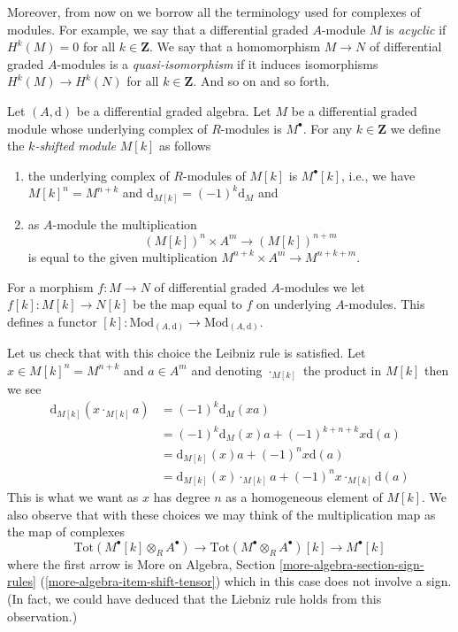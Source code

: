 \medskip\noindent
Moreover, from now on we borrow all the terminology used for
complexes of modules. For example, we say that a differential
graded $A$-module $M$ is {\it acyclic} if $H^k(M) = 0$ for
all $k \in \mathbf{Z}$. We say that a homomorphism $M \to N$
of differential graded $A$-modules is a {\it quasi-isomorphism}
if it induces isomorphisms $H^k(M) \to H^k(N)$ for all $k \in \mathbf{Z}$.
And so on and so forth.

\begin{definition}
\label{definition-shift}
Let $(A, \text{d})$ be a differential graded algebra.
Let $M$ be a differential graded module whose underlying complex
of $R$-modules is $M^\bullet$. For any $k \in \mathbf{Z}$
we define the {\it $k$-shifted module} $M[k]$ as follows
\begin{enumerate}
\item the underlying complex of $R$-modules of $M[k]$ is $M^\bullet[k]$,
i.e., we have $M[k]^n = M^{n + k}$ and
$\text{d}_{M[k]} = (-1)^k\text{d}_M$ and
\item as $A$-module the multiplication
$$
(M[k])^n \times A^m \longrightarrow (M[k])^{n + m}
$$
is equal to the given multiplication $M^{n + k} \times A^m \to M^{n + k + m}$.
\end{enumerate}
For a morphism $f : M \to N$ of differential graded $A$-modules
we let $f[k] : M[k] \to N[k]$ be the map equal to $f$ on underlying
$A$-modules. This defines a functor
$[k] : \text{Mod}_{(A, \text{d})} \to \text{Mod}_{(A, \text{d})}$.
\end{definition}

\noindent
Let us check that with this choice the Leibniz rule is satisfied.
Let $x \in M[k]^n = M^{n + k}$ and $a \in A^m$ and denoting
$\cdot_{M[k]}$ the product in $M[k]$ then we see
\begin{align*}
\text{d}_{M[k]}(x \cdot_{M[k]} a)
& =
(-1)^k \text{d}_M(xa) \\
& =
(-1)^k \text{d}_M(x) a + (-1)^{k + n + k} x \text{d}(a) \\
& =
\text{d}_{M[k]}(x) a + (-1)^n x \text{d}(a) \\
& =
\text{d}_{M[k]}(x) \cdot_{M[k]} a + (-1)^n x \cdot_{M[k]} \text{d}(a)
\end{align*}
This is what we want as $x$ has degree $n$ as a homogeneous element of $M[k]$.
We also observe that with these choices we may think of
the multiplication map as the map of complexes
$$
\text{Tot}(M^\bullet[k] \otimes _R A^\bullet) \to
\text{Tot}(M^\bullet \otimes _R A^\bullet)[k] \to
M^\bullet[k]
$$
where the first arrow is
More on Algebra, Section \ref{more-algebra-section-sign-rules}
(\ref{more-algebra-item-shift-tensor}) which in this
case does not involve a sign. (In fact, we could have deduced
that the Liebniz rule holds from this observation.)

